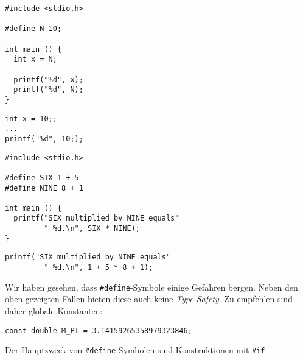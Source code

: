 \begin{frame}[fragile]{}
%
%
\begin{minipage}{.495\linewidth}
\begin{warnbox}[Kein Semikolon, leftupper=6mm, equal height group=grDangers1]
\begin{verbatim}
#include <stdio.h>

#define N 10;

int main () {
  int x = N;
  
  printf("%d", x);
  printf("%d", N);
}

\end{verbatim}
\end{warnbox}
%
\begin{codebox}[Expansion, leftupper=6mm, equal height group=grDangers2]
\begin{verbatim}
int x = 10;;
...  
printf("%d", 10;);
\end{verbatim}
\end{codebox}
\end{minipage}
%
%
\begin{minipage}{.495\linewidth}
\begin{warnbox}[Klammern, leftupper=6mm, equal height group=grDangers1]
\begin{verbatim}
#include <stdio.h>

#define SIX 1 + 5
#define NINE 8 + 1

int main () {
  printf("SIX multiplied by NINE equals"
         " %d.\n", SIX * NINE);
}
\end{verbatim}
\end{warnbox}
%
\begin{codebox}[Expansion, leftupper=6mm, equal height group=grDangers2]
\begin{verbatim}
printf("SIX multiplied by NINE equals"
         " %d.\n", 1 + 5 * 8 + 1);
\end{verbatim}
\end{codebox}
\end{minipage}
%
\end{frame}


\begin{frame}[fragile]
%
\begin{hintbox}
Wir haben gesehen, dass \texttt{#define}-Symbole einige Gefahren bergen. Neben den oben gezeigten Fallen bieten diese auch keine \emph{Type Safety}. Zu empfehlen sind daher globale Konstanten:
\begin{center}
\texttt{const double M_PI = 3.14159265358979323846;}
\end{center}

Der Hauptzweck von \texttt{#define}-Symbolen sind Konstruktionen mit \texttt{#if}.
\end{hintbox}
%
\end{frame}

